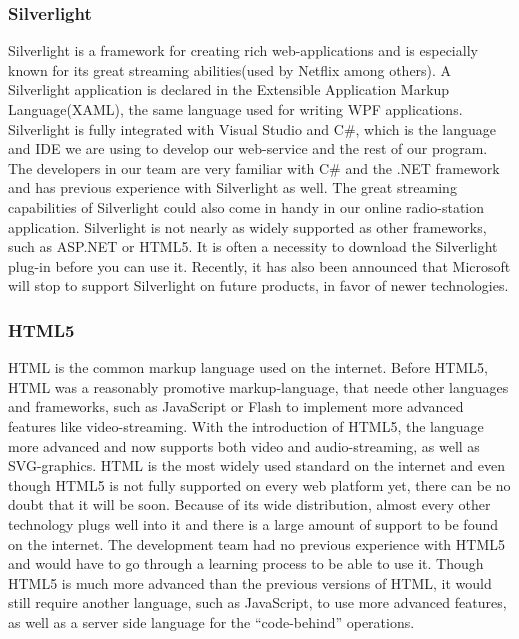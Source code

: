 \documentclass[a4paper,11pt,report]{article}
\begin{document}
{\subsubsection{Silverlight}
Silverlight is a framework for creating rich web-applications and is especially known for its great streaming abilities(used by Netflix among others). A Silverlight application is declared in the Extensible Application Markup Language(XAML), the same language used for writing WPF applications.  Silverlight is fully integrated with Visual Studio and C\#, which is the language and IDE we are using to develop our web-service and the rest of our program. The developers in our team are very familiar with C\# and the .NET framework and has previous experience with Silverlight as well. The great streaming capabilities of Silverlight could also come in handy in our online radio-station application. Silverlight is not nearly as widely supported as other frameworks, such as ASP.NET or HTML5. It is often a necessity to download the Silverlight plug-in before you can use it. Recently, it has also been announced that Microsoft will stop to support Silverlight on future products, in favor of newer technologies.

\subsubsection{HTML5}

HTML is the common markup language used on the internet. Before HTML5, HTML was a reasonably promotive markup-language, that neede other languages and frameworks, such as JavaScript or Flash to implement more advanced features like video-streaming. With the introduction of HTML5, the language more advanced and now supports both video and audio-streaming, as well as SVG-graphics. HTML is the most widely used standard on the internet and even though HTML5 is not fully supported on every web platform yet, there can be no doubt that it will be soon. Because of its wide distribution, almost every other technology plugs well into it and there is a large amount of support to be found on the internet. The development team had no previous experience with HTML5 and would have to go through a learning process to be able to use it. Though HTML5 is much more advanced than the previous versions of HTML, it would still require another language, such as JavaScript, to use more advanced features, as well as a server side language for the “code-behind” operations.

}
\end{document}

